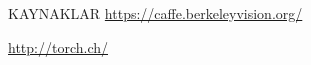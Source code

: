 \documentclass{beamer}                                                                                          %
\begin{document}
\begin{frame}{KAYNAKLAR}
        \color{myred1} \color{black} \href{https://caffe.berkeleyvision.org/}{https://caffe.berkeleyvision.org/}\par \vspace{15}
        
        
        \color{myred1} \color{black} \href{http://torch.ch/}{http://torch.ch/}\par \vspace{15}
         \vspace{15}
        
\end{frame}
	
	
	
\end{document}
